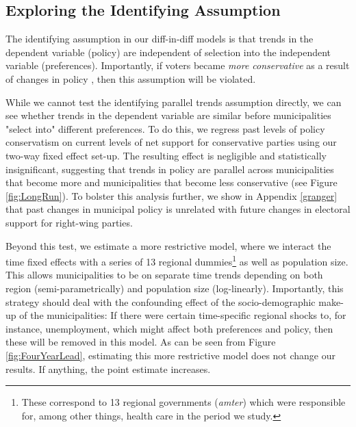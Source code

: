 \documentclass[a4paper,12pt]{article}
\begin{document}
\subsection*{Exploring the Identifying Assumption}
The identifying assumption in our diff-in-diff models is that trends in the dependent variable (policy) are independent of selection into the independent variable (preferences). Importantly, if voters became \emph{more conservative} as a result of changes in policy \cite[cf.][]{lenz2013follow}, then this assumption will be violated.

While we cannot test the identifying parallel trends assumption directly, we can see whether trends in the dependent variable are similar before municipalities "select into" different preferences.  To do this, we regress past levels of policy conservatism on current levels of net support for conservative parties using our two-way fixed effect set-up. The resulting effect is negligible and statistically insignificant, suggesting that trends in policy are parallel across municipalities that become more and municipalities that become less conservative  (see Figure \ref{fig:LongRun}). To  bolster this analysis further,  we show in Appendix \ref{granger} that past changes in municipal policy is unrelated with future changes in electoral support for right-wing parties.


Beyond this test,  we estimate a more restrictive model, where we interact the time fixed effects with a series of 13 regional dummies\footnote{These correspond to  13 regional governments (\textit{amter}) which were responsible for, among other things, health care in the period we study.} as well as population size. This allows municipalities to be on separate time trends depending on both region (semi-parametrically) and population size (log-linearly). Importantly, this strategy should deal with the confounding effect of the socio-demographic make-up of the municipalities: If there were certain time-specific regional shocks to, for instance, unemployment, which might affect both preferences and policy, then these will be removed in this model. As can be seen from Figure \ref{fig:FourYearLead}, estimating this more restrictive model does not change our results. If anything, the point estimate increases.
\end{document}
